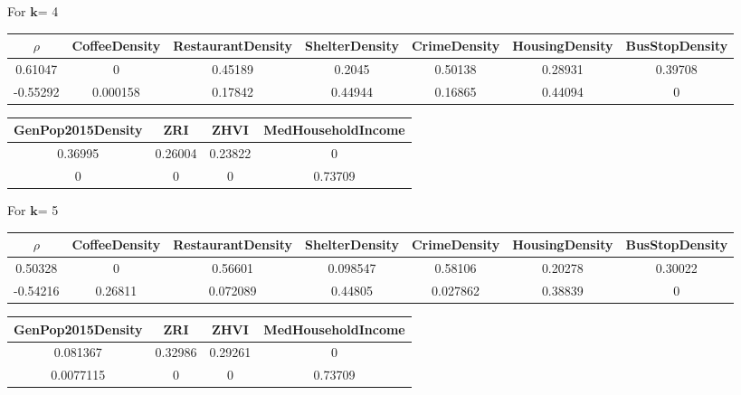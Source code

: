 \documentclass[11pt,letterpaper]{article}
\def\k{$\textbf{k}$}
\begin{document}
	For \k = 4
\begin{small}
\begin{center}
\begin{tabular}{|c|c|c|c|c|c|c|}
\hline 
$\rho$ & CoffeeDensity & RestaurantDensity & ShelterDensity & CrimeDensity & HousingDensity & BusStopDensity \\ 
\hline 
0.61047  & 0 & 0.45189 & 0.2045          &  0.50138     & 0.28931  & 0.39708    \\ 
\hline 
-0.55292 & 0.000158 & 0.17842 & 0.44944 &  0.16865 & 0.44094 &  0\\ 
\hline 
\end{tabular} 
\end{center}

\begin{flushleft}
\begin{tabular}{|c|c|c|c|}
\hline 
GenPop2015Density & ZRI & ZHVI & MedHouseholdIncome \\ 
\hline 
0.36995 & 0.26004 & 0.23822 & 0 \\ 
\hline 
0 & 0 & 0 & 0.73709 \\ 
\hline 
\end{tabular} 
\end{flushleft}
\end{small}

	For \k = 5
\begin{small}
\begin{center}
\begin{tabular}{|c|c|c|c|c|c|c|}
\hline 
$\rho$ & CoffeeDensity & RestaurantDensity & ShelterDensity & CrimeDensity & HousingDensity & BusStopDensity \\ 
\hline 
0.50328  & 0 & 0.56601 & 0.098547 &  0.58106     & 0.20278  & 0.30022    \\ 
\hline 
-0.54216 & 0.26811 & 0.072089 & 0.44805 & 0.027862 &  0.38839 & 0 \\ 
\hline 
\end{tabular} 
\end{center}

\begin{flushleft}
\begin{tabular}{|c|c|c|c|}
\hline 
GenPop2015Density & ZRI & ZHVI & MedHouseholdIncome \\ 
\hline 
0.081367 & 0.32986 & 0.29261 & 0 \\ 
\hline 
0.0077115 & 0 & 0 & 0.73709 \\ 
\hline 
\end{tabular} 
\end{flushleft}
\end{small}
\end{document}

